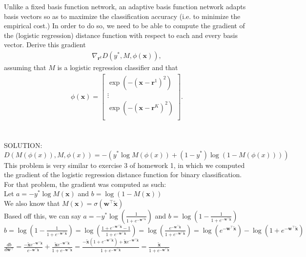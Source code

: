 \documentclass{article}
\newcommand{\vect}[1]{\mathbf{#1}}
\newcommand{\vx}[0]{\vect{x}}
\newcommand{\vw}[0]{\vect{w}}
\newcommand{\vr}[0]{\vect{r}}
\newcommand{\sigmoid}{\sigma}
\begin{document}
Unlike a fixed basis function network, an adaptive basis function network adapts
basis vectors so as to maximize the classification accuracy (i.e. to minimize
the empirical cost.) In order to do so, we need to be able to compute the
gradient of the (logistic regression) distance function with respect to each and
every basis vector. Derive this gradient 
\begin{align*}
    \nabla_{\vr^k} D(y^*, M, \phi(\vx)),
\end{align*}
assuming that $M$ is a logistic regression classifier and that
\begin{align*}
    \phi(\vx) = \left[ 
        \begin{array}{c}
            \exp\left( -(\vx - \vr^1)^2 \right)  \\
            \vdots \\
            \exp\left( -(\vx - \vr^K)^2 \right)  \\
        \end{array}
    \right].
\end{align*}
\\
\\
SOLUTION: \\ 
$D(M(\phi(x)),M,\phi(x)) = -(y^*\log M(\phi(x))+(1-y^*)\log(1-M(\phi(x))))$ \\
This problem is very similar to exercise 3 of homework 1, in which we computed the gradient of the logistic regression distance function for binary classification. For that problem, the gradient was computed as such: \\ 
Let $a = -y^* \log M(\vx)$ and $b =  \log (1- M(\vx))$ \\
We also know that $M(\vx) = \sigmoid(\vw^\top \tilde{\vx}) $ \\
Based off this, we can say $a = -y^* \log ( \frac{1}{1+e^{-\vw^{\top \tilde{\vx}}}})$ and $b =  \log (1- \frac{1}{1+e^{-\vw^\top \tilde{\vx}}})$ \\
$b = \log (1- \frac{1}{1+e^{-\vw^\top \tilde{\vx}}}) = \log ( \frac{1+e^{-\vw^\top \tilde{\vx} } - 1}{1+e^{-\vw^\top \tilde{\vx}}}) = \log ( \frac{e^{-\vw^\top \tilde{\vx} }}{1+e^{-\vw^\top \tilde{\vx}}}) =  \log ( e^{-\vw^\top \tilde{\vx} } ) - \log (1+e^{-\vw^\top \tilde{\vx}}) $ \\
$ \frac{db}{d \vw^\top} = \frac{-\tilde{\vx} e^{-\vw^\top \tilde{\vx}}}{e^{-\vw^\top \tilde{\vx}}} + \frac{\tilde{\vx} e^{-\vw^\top \tilde{\vx}}}{1 + e^{-\vw^\top \tilde{\vx}}}  = \frac{-\tilde{\vx} (1 + e^{-\vw^\top \tilde{\vx}}) +\tilde{\vx} e^{-\vw^\top \tilde{\vx}}}{1 + e^{-\vw^\top \tilde{\vx}}}  = \frac{\tilde{\vx}}{1 + e^{-\vw^\top \tilde{\vx}}}$ \\
\end{document}
